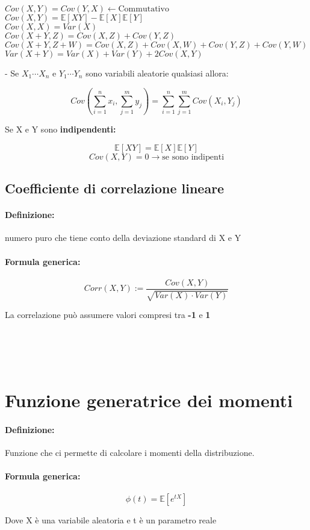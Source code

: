 \documentclass[]{article}
\newcommand{\ev}{\mathbb{E}[X]}
\renewcommand{\ev}[1]{\mathbb{E}[#1]}
\newcommand{\definizione}{\paragraph{Definizione:}}
\newcommand{\formula}{\paragraph{Formula generica:}}
\begin{document}
    $ Cov(X, Y) = Cov(Y, X) \longleftarrow \text{Commutativo} $ \\
    $ Cov(X, Y) = \ev{XY} - \ev{X} \ev{Y} $ \\ 
    $ Cov(X, X) = Var(X) $ \\
    $ Cov(X+Y, Z) = Cov(X, Z) + Cov(Y, Z) $ \\
    $ Cov(X+Y, Z+W) = Cov(X, Z) + Cov(X, W) + Cov(Y, Z) + Cov(Y, W) $ \\
    $ Var(X + Y) = Var(X) + Var(Y) + 2 Cov(X, Y) $ \\
    
    \centerline{- Se $X_1 \cdots X_n$ e $Y_1 \cdots Y_n$ sono variabili aleatorie qualsiasi allora:}
    \[ Cov(\sum_{i = 1}^{n}x_i, \sum_{j = 1}^{m} y_j) = \sum_{i = 1}^{n} \sum_{j = 1}^{m} Cov(X_i, Y_j) \]
    \linebreak[10]
    \centerline{Se X e Y sono \textbf{indipendenti:}}
    \[ \ev{XY} = \ev{X} \ev{Y} \]
    \[ Cov(X, Y) = 0 \longrightarrow \text{se sono indipenti}\]

    
    \subsection{Coefficiente di correlazione lineare}
    \definizione numero puro che tiene conto della deviazione standard di X e Y
    \formula
    \begin{equation*}
        Corr(X,Y) := \frac{Cov(X,Y)}{\sqrt{Var(X) \cdot Var(Y)}}
    \end{equation*}

    \begin{center}
        La correlazione può assumere valori compresi tra \textbf{-1} e \textbf{1}
    \end{center}
     \\
     \\
     \\

    \newpage
    \section{Funzione generatrice dei momenti}
    \definizione Funzione che ci permette di calcolare i momenti della distribuzione.
    \formula \[ \phi(t) = \ev{e^{tX}}\]
    \begin{center}
        Dove X è una variabile aleatoria e t è un parametro reale
    \end{center}
\end{document}
